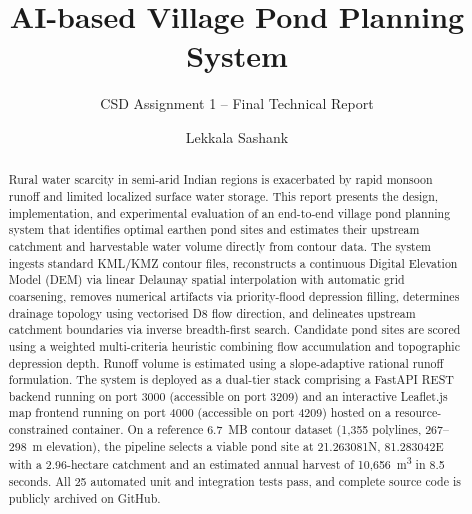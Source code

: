 \documentclass[manuscript,screen,review]{acmart}
\begin{document}
\title{AI-based Village Pond Planning System}
\subtitle{CSD Assignment 1 -- Final Technical Report}

\author{Lekkala Sashank}

\renewcommand{\shortauthors}{Lekkala Sashank}

\begin{abstract}
Rural water scarcity in semi-arid Indian regions is exacerbated by rapid monsoon runoff
and limited localized surface water storage. This report presents the design, implementation,
and experimental evaluation of an end-to-end village pond planning system that identifies optimal
earthen pond sites and estimates their upstream catchment and harvestable water volume directly
from contour data. The system ingests standard KML/KMZ contour files, reconstructs a continuous
Digital Elevation Model (DEM) via linear Delaunay spatial interpolation with automatic grid coarsening,
removes numerical artifacts via priority-flood depression filling, determines drainage topology
using vectorised D8 flow direction, and delineates upstream catchment boundaries via inverse
breadth-first search. Candidate pond sites are scored using a weighted multi-criteria heuristic
combining flow accumulation and topographic depression depth. Runoff volume is estimated using
a slope-adaptive rational runoff formulation. The system is deployed as a dual-tier stack comprising
a FastAPI REST backend running on port 3000 (accessible on port 3209) and an interactive Leaflet.js
map frontend running on port 4000 (accessible on port 4209) hosted on a resource-constrained container.
On a reference 6.7~MB contour dataset (1,355 polylines, 267--298~m elevation), the pipeline
selects a viable pond site at 21.263081\textdegree N, 81.283042\textdegree E with a 2.96-hectare
catchment and an estimated annual harvest of 10,656~m\textsuperscript{3} in 8.5 seconds.
All 25 automated unit and integration tests pass, and complete source code is publicly archived on GitHub.
\end{abstract}


\maketitle
\end{document}
